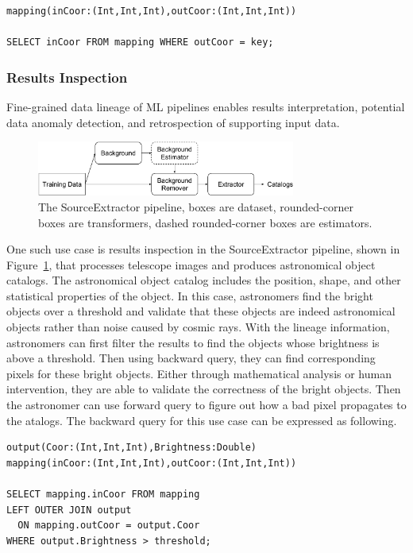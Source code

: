 \documentclass{sig-alternate}
\begin{document}
\begin{lstlisting}
mapping(inCoor:(Int,Int,Int),outCoor:(Int,Int,Int))

SELECT inCoor FROM mapping WHERE outCoor = key;
\end{lstlisting}

\subsubsection{Results Inspection}
Fine-grained data lineage of ML pipelines enables results interpretation, potential data anomaly detection, 
and retrospection of supporting input data.

\begin{figure}[ht]
\begin{center}
    \includegraphics[width=85mm]{pictures/SourceExtractor}
    \caption {The SourceExtractor pipeline, boxes are dataset, rounded-corner boxes are transformers, dashed rounded-corner boxes are estimators.
    \label{fig:sourceextractor}
}
\end{center}
\end{figure}

One such use case is results inspection in the SourceExtractor pipeline, shown in Figure~\ref{fig:sourceextractor},
that processes telescope images and produces astronomical object catalogs. 
The astronomical object catalog includes the position, shape, and other statistical properties of the object.
In this case, astronomers find the bright objects over a threshold and validate that these objects are indeed astronomical objects rather
than noise caused by cosmic rays.
With the lineage information, astronomers can first filter the results to find the objects whose brightness is above a threshold.
Then using backward query, they can find corresponding pixels for these bright objects. 
Either through mathematical analysis or human intervention, they are able to validate the correctness of the bright objects.
Then the astronomer can use forward query to figure out how a bad pixel propagates to the atalogs.
The backward query for this use case can be expressed as following.
\begin{lstlisting}
output(Coor:(Int,Int,Int),Brightness:Double)
mapping(inCoor:(Int,Int,Int),outCoor:(Int,Int,Int))

SELECT mapping.inCoor FROM mapping 
LEFT OUTER JOIN output
  ON mapping.outCoor = output.Coor
WHERE output.Brightness > threshold;
\end{lstlisting}
\end{document}
